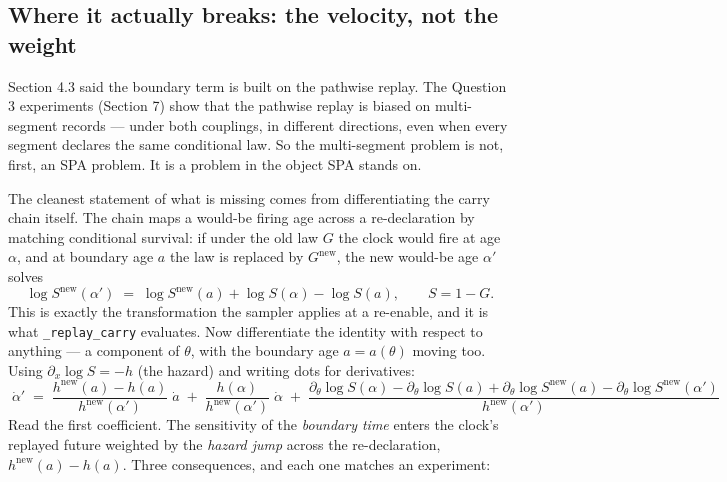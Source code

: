 \documentclass[11pt]{article}
\newcommand{\code}[1]{\texttt{#1}}
\begin{document}
\subsection{Where it actually breaks: the velocity, not the weight}

Section 4.3 said the boundary term is built on the pathwise replay. The
Question 3 experiments (Section 7) show that the pathwise replay is
biased on multi-segment records --- under both couplings, in different
directions, even when every segment declares the same conditional law.
So the multi-segment problem is not, first, an SPA problem. It is a
problem in the object SPA stands on.

The cleanest statement of what is missing comes from differentiating the
carry chain itself. The chain maps a would-be firing age across a
re-declaration by matching conditional survival: if under the old law
$G$ the clock would fire at age $\alpha$, and at boundary age $a$ the law
is replaced by $G^{\mathrm{new}}$, the new would-be age
$\alpha'$ solves
\[
\log S^{\mathrm{new}}(\alpha') \;=\;
\log S^{\mathrm{new}}(a) + \log S(\alpha) - \log S(a),
\qquad S = 1 - G .
\]
This is exactly the transformation the sampler applies at a re-enable,
and it is what \code{\_replay\_carry} evaluates. Now differentiate the
identity with respect to anything --- a component of $\theta$, with the
boundary age $a = a(\theta)$ moving too. Using
$\partial_x \log S = -h$ (the hazard) and writing dots for derivatives:
\[
\boxed{\;
\dot{\alpha}'
\;=\;
\frac{h^{\mathrm{new}}(a) - h(a)}{h^{\mathrm{new}}(\alpha')}\;\dot{a}
\;+\;
\frac{h(\alpha)}{h^{\mathrm{new}}(\alpha')}\;\dot{\alpha}
\;+\;
\frac{\partial_\theta \log S(\alpha) - \partial_\theta \log S(a)
      + \partial_\theta \log S^{\mathrm{new}}(a)
      - \partial_\theta \log S^{\mathrm{new}}(\alpha')}
     {h^{\mathrm{new}}(\alpha')}
\;}
\]
Read the first coefficient. The sensitivity of the \emph{boundary time}
enters the clock's replayed future weighted by the \emph{hazard jump}
across the re-declaration, $h^{\mathrm{new}}(a) - h(a)$. Three
consequences, and each one matches an experiment:
\end{document}

